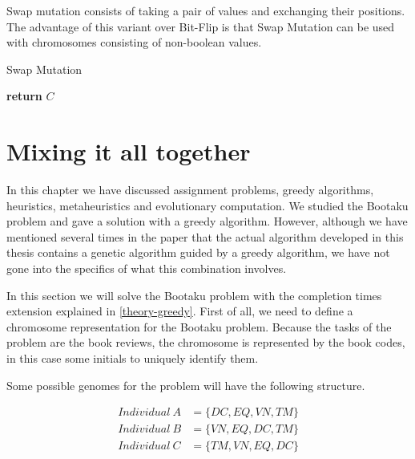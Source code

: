 Swap mutation consists of taking a pair of values and exchanging their positions. The advantage of this variant over Bit-Flip is that Swap Mutation can be used with chromosomes consisting of non-boolean values. 

\begin{algorithm}[H]
    \caption{Swap Mutation}
    \begin{algorithmic}[1]
            \EndWhile
            \State \textbf{return} $C$
        \EndProcedure
    \end{algorithmic}
\end{algorithm}



\section{Mixing it all together}

In this chapter we have discussed assignment problems, greedy algorithms, heuristics, metaheuristics and evolutionary computation. We studied the Bootaku problem and gave a solution with a greedy algorithm. However, although we have mentioned several times in the paper that the actual algorithm developed in this thesis contains a genetic algorithm guided by a greedy algorithm, we have not gone into the specifics of what this combination involves.

In this section we will solve the Bootaku problem with the completion times extension explained in \ref{theory-greedy}. First of all, we need to define a chromosome representation for the Bootaku problem. Because the tasks of the problem are the book reviews, the chromosome is represented by the book codes, in this case some initials to uniquely identify them.

Some possible genomes for the problem will have the following structure.

\begin{align}
    Individual\ A &= \{ DC, EQ, VN, TM \}\\
    Individual\ B &= \{ VN, EQ, DC, TM \}\\
    Individual\ C &= \{ TM, VN, EQ, DC \}
\end{align}

